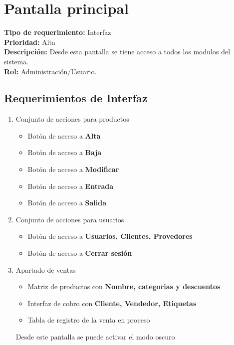 \documentclass[a4paper,DIV=12]{scrreprt}
\begin{document}
\newpage
\setcounter{chapter}{7}
\setcounter{section}{-1}
\setcounter{subsection}{-1}
\section{Pantalla principal}
\noindent
\textbf{Tipo de requerimiento:} Interfaz\\
\textbf{Prioridad:} Alta\\
\textbf{Descripción:} Desde esta pantalla se tiene acceso a todos los modulos del sistema.\\
\textbf{Rol:} Administración/Usuario.
\subsection*{Requerimientos de Interfaz}
\begin{enumerate}
	\item Conjunto de acciones para productos
	\begin{itemize}
		\item  Botón de acceso a \textbf{Alta}
		\item  Botón de acceso a \textbf{Baja}
		\item  Botón de acceso a \textbf{Modificar}
		\item  Botón de acceso a \textbf{Entrada}
		\item  Botón de acceso a \textbf{Salida}
	\end{itemize}
	
	
	\item Conjunto de acciones para usuarios
	\begin{itemize}
		\item  Botón de acceso a \textbf{Usuarios, Clientes, Provedores}
		\item  Botón de acceso a \textbf{Cerrar sesión}
	\end{itemize}	


    \item Apartado de ventas
    \begin{itemize}
        \item Matriz de productos con \textbf{Nombre, categorias y descuentos}
        \item Interfaz de cobro con \textbf{Cliente, Vendedor, Etiquetas}
        \item Tabla de registro de la venta en proceso
    \end{itemize}
Desde este pantalla se puede activar el modo oscuro
\end{enumerate}
\newpage
\end{document}
